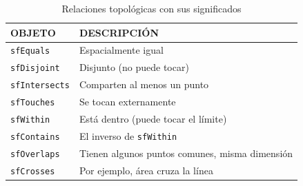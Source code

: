 \begin{table}[H]
	\caption{Relaciones topológicas con sus significados}
	\label{topo-geosparql}
	\centering
	\begin{tabular}{|l|l|}
		\hline
		\rowcolor[HTML]{EFEFEF} 
		{\textbf{OBJETO}} & { \textbf{DESCRIPCIÓN}} \\ \hline
	\texttt{sfEquals}	&              Espacialmente igual           \\ \hline
	\texttt{sfDisjoint}	&        Disjunto (no puede tocar)                 \\ \hline
	\texttt{sfIntersects}	&     Comparten al menos un punto                    \\ \hline
\texttt{sfTouches} &          Se tocan externamente               \\ \hline
	\texttt{sfWithin}	&      Está dentro (puede tocar el límite)                   \\ \hline
\texttt{sfContains} &             El inverso de \texttt{sfWithin}            \\ \hline
	\texttt{sfOverlaps}	&            Tienen algunos puntos comunes, misma dimensión             \\ \hline
\texttt{sfCrosses} &         Por ejemplo, área cruza la línea                \\ \hline		
	\end{tabular}
\end{table}


